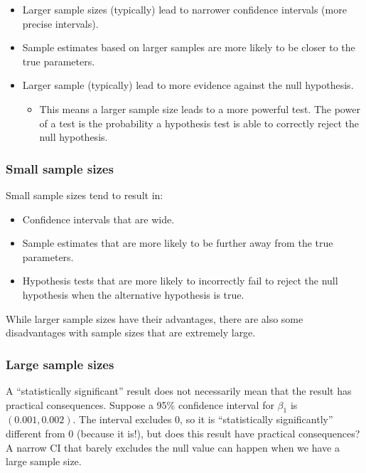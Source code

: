\documentclass[
]{book}
\providecommand{\tightlist}{%
  \setlength{\itemsep}{0pt}\setlength{\parskip}{0pt}}
\begin{document}
\begin{itemize}
\tightlist
\item
  Larger sample sizes (typically) lead to narrower confidence intervals (more precise intervals).
\item
  Sample estimates based on larger samples are more likely to be closer to the true parameters.
\item
  Larger sample (typically) lead to more evidence against the null hypothesis.

  \begin{itemize}
  \tightlist
  \item
    This means a larger sample size leads to a more powerful test. The power of a test is the probability a hypothesis test is able to correctly reject the null hypothesis.
  \end{itemize}
\end{itemize}

\hypertarget{small-sample-sizes}{%
\subsubsection{Small sample sizes}\label{small-sample-sizes}}

Small sample sizes tend to result in:

\begin{itemize}
\tightlist
\item
  Confidence intervals that are wide.
\item
  Sample estimates that are more likely to be further away from the true parameters.
\item
  Hypothesis tests that are more likely to incorrectly fail to reject the null hypothesis when the alternative hypothesis is true.
\end{itemize}

While larger sample sizes have their advantages, there are also some disadvantages with sample sizes that are extremely large.

\hypertarget{large-sample-sizes}{%
\subsubsection{Large sample sizes}\label{large-sample-sizes}}

A ``statistically significant'' result does not necessarily mean that the result has practical consequences. Suppose a 95\% confidence interval for \(\beta_1\) is \((0.001, 0.002)\). The interval excludes 0, so it is ``statistically significantly'' different from 0 (because it is!), but does this result have practical consequences? A narrow CI that barely excludes the null value can happen when we have a large sample size.
\end{document}
